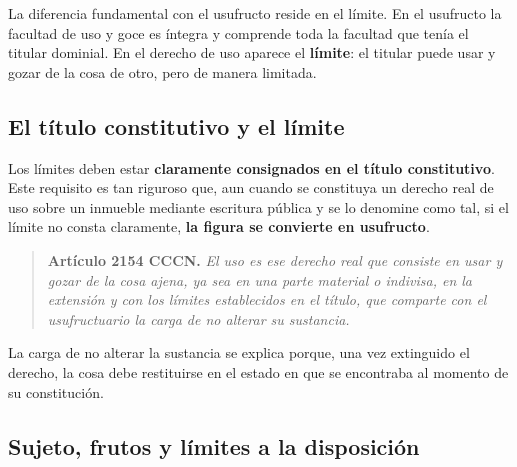 \documentclass[12pt,oneside]{book}
\begin{document}
La diferencia fundamental con el usufructo reside en el límite. En el usufructo la facultad de uso y goce es íntegra y comprende toda la facultad que tenía el titular dominial.
En el derecho de uso aparece el \textbf{límite}: el titular puede usar y gozar de la cosa de otro, pero de manera limitada.

\subsection{El título constitutivo y el límite}

Los límites deben estar \textbf{claramente consignados en el título constitutivo}. Este requisito es tan riguroso que, aun cuando se constituya un derecho real de uso sobre un inmueble mediante escritura pública y se lo denomine como tal, si el límite no consta claramente, \textbf{la figura se convierte en usufructo}.

\begin{quote}
\textbf{Artículo 2154 CCCN.} \textit{El uso es ese derecho real que consiste en usar y gozar de la cosa ajena, ya sea en una parte material o indivisa, en la extensión y con los límites establecidos en el título, que comparte con el usufructuario la carga de no alterar su sustancia.}
\end{quote}

La carga de no alterar la sustancia se explica porque, una vez extinguido el derecho, la cosa debe restituirse en el estado en que se encontraba al momento de su constitución.

\subsection{Sujeto, frutos y límites a la disposición}
\end{document}
